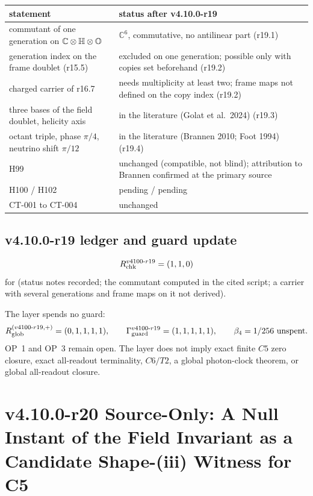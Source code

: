 \begin{center}
\small
\begin{tabular}{@{}>{\raggedright\arraybackslash}p{}>{\raggedright\arraybackslash}p{}@{}}
\toprule
statement & status after v4.10.0-r19\\
\midrule
commutant of one generation on \(\mathbb C\otimes\mathbb{H}\otimes\mathbb{O}\) & \(\mathbb C^6\), commutative, no antilinear part (r19.1)\\
generation index on the frame doublet (r15.5) & excluded on one generation; possible only with copies set beforehand (r19.2)\\
charged carrier of r16.7 & needs multiplicity at least two; frame maps not defined on the copy index (r19.2)\\
three bases of the field doublet, helicity axis & in the literature (Golat et al.\ 2024) (r19.3)\\
octant triple, phase \(\pi/4\), neutrino shift \(\pi/12\) & in the literature (Brannen 2010; Foot 1994) (r19.4)\\
H99 & unchanged (compatible, not blind); attribution to Brannen confirmed at the primary source\\
H100 / H102 & pending / pending\\
CT-001 to CT-004 & unchanged\\
\bottomrule
\end{tabular}
\end{center}

\subsection*{v4.10.0-r19 ledger and guard update}
\label{subsec:v4100-r19-ledger-guard}

\[
R_{\rm chk}^{v4100\text{-}r19}=(1,1,0)
\]
for (status notes recorded; the commutant computed in the cited script; a carrier with several generations and frame maps
on it not derived).

The layer spends no guard:
\[
R_{\rm glob}^{(v4100\text{-}r19,+)}=(0,1,1,1,1),
\qquad
\Gamma_{\rm guard}^{v4100\text{-}r19}=(1,1,1,1,1),
\qquad
\beta_4=1/256\ \text{unspent}.
\]
OP~1 and OP~3 remain open.  The layer does not imply exact finite \(C5\) zero closure, exact all-readout terminality,
\(C6/T2\), a global photon-clock theorem, or global all-readout closure.

\clearpage
\section*{v4.10.0-r20 Source-Only: A Null Instant of the Field Invariant as a Candidate Shape-(iii) Witness for C5}
\label{sec:v4100-r20-c5-null-instant}

